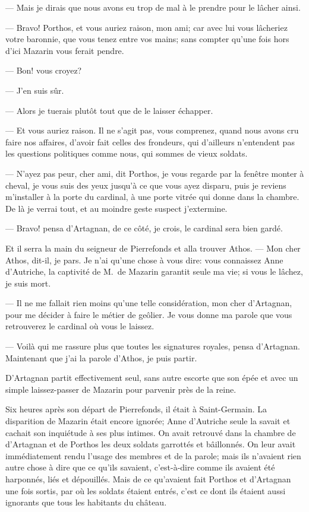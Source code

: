 — Mais je dirais que nous avons eu trop de mal à le prendre pour le lâcher ainsi.

— Bravo! Porthos, et vous auriez raison, mon ami; car avec lui vous lâcheriez votre baronnie, que vous tenez entre vos mains; sans compter qu'une fois hors d'ici Mazarin vous ferait pendre.

— Bon! vous croyez?

— J'en suis sûr.

— Alors je tuerais plutôt tout que de le laisser échapper.

— Et vous auriez raison. Il ne s'agit pas, vous comprenez, quand nous avons cru faire nos affaires, d'avoir fait celles des frondeurs, qui d'ailleurs n'entendent pas les questions politiques comme nous, qui sommes de vieux soldats.

— N'ayez pas peur, cher ami, dit Porthos, je vous regarde par la fenêtre monter à cheval, je vous suis des yeux jusqu'à ce que vous ayez disparu, puis je reviens m'installer à la porte du cardinal, à une porte vitrée qui donne dans la chambre. De là je verrai tout, et au moindre geste suspect j'extermine.

— Bravo! pensa d'Artagnan, de ce côté, je crois, le cardinal sera bien gardé.

Et il serra la main du seigneur de Pierrefonds et alla trouver Athos.
— Mon cher Athos, dit-il, je pars. Je n'ai qu'une chose à vous dire: vous connaissez Anne d'Autriche, la captivité de M.~de Mazarin garantit seule ma vie; si vous le lâchez, je suis mort.

— Il ne me fallait rien moins qu'une telle considération, mon cher d'Artagnan, pour me décider à faire le métier de geôlier. Je vous donne ma parole que vous retrouverez le cardinal où vous le laissez.

— Voilà qui me rassure plus que toutes les signatures royales, pensa d'Artagnan. Maintenant que j'ai la parole d'Athos, je puis partir.

D'Artagnan partit effectivement seul, sans autre escorte que son épée et avec un simple laissez-passer de Mazarin pour parvenir près de la reine.

Six heures après son départ de Pierrefonds, il était à Saint-Germain.
La disparition de Mazarin était encore ignorée; Anne d'Autriche seule la savait et cachait son inquiétude à ses plus intimes. On avait retrouvé dans la chambre de d'Artagnan et de Porthos les deux soldats garrottés et bâillonnés. On leur avait immédiatement rendu l'usage des membres et de la parole; mais ils n'avaient rien autre chose à dire que ce qu'ils savaient, c'est-à-dire comme ils avaient été harponnés, liés et dépouillés. Mais de ce qu'avaient fait Porthos et d'Artagnan une fois sortis, par où les soldats étaient entrés, c'est ce dont ils étaient aussi ignorants que tous les habitants du château.

